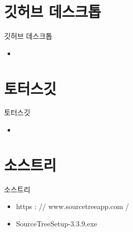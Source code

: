 \documentclass[aspectratio=1610,20pt,xcolor=pdftex,dvipsnames,table,handout]{beamer}
\begin{document}
		\section{깃허브 데스크톱}

		\begin{frame} [t,plain]

			\begin{block} {깃허브 데스크톱}
			\setlength{\leftmargini}{2em}			
			\begin{itemize}
				\item 
			\end{itemize}
			\end{block}						

		\end{frame}						


		\section{토터스깃}


		\begin{frame} [t,plain]

			\begin{block} {토터스깃}
			\setlength{\leftmargini}{2em}			
			\begin{itemize}
				\item 
			\end{itemize}
			\end{block}						

		\end{frame}						

		\section{소스트리}


		\begin{frame} [t,plain]

			\begin{block} {소스트리}
			\setlength{\leftmargini}{2em}			
			\begin{itemize}
				\item https : // www.sourcetreeapp.com /
				\item SourceTreeSetup-3.3.9.exe
			\end{itemize}
			\end{block}						

		\end{frame}						
\end{document}
